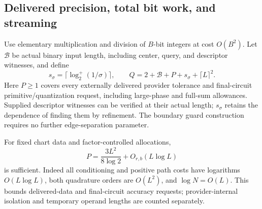 \subsection{Delivered precision, total bit work, and streaming}
\label{subsec:bit-complexity}
Use elementary multiplication and division of \(B\)-bit integers at
cost \(O(B^2)\). Let \(\mathcal B\) be actual binary input length,
including center, query, and descriptor witnesses, and define
\[
 s_\sigma=\lceil\log_2^+(1/\sigma)\rceil,\qquad
 Q=2+\mathcal B+P+s_\sigma+\lceil L\rceil^2.
\]
Here \(P\ge1\) covers every externally delivered provider tolerance
and final-circuit primitive/quantization request, including large-phase
and full-sum allowances. Supplied descriptor witnesses can be verified
at their actual length; \(s_\sigma\) retains the dependence of finding
them by refinement. The boundary guard construction requires no further
edge-separation parameter.

For fixed chart data and factor-controlled allocations,
\begin{equation}
 P=\frac{3L^2}{8\log2}+O_{r,b}(L\log L)
 \label{eq:effective-precision}
\end{equation}
is sufficient. Indeed all conditioning and positive path costs have
logarithms \(O(L\log L)\), both quadrature orders are \(O(L^2)\),
and \(\log N=O(L)\). This bounds delivered-data and final-circuit
accuracy requests; provider-internal isolation and temporary operand
lengths are counted separately.

